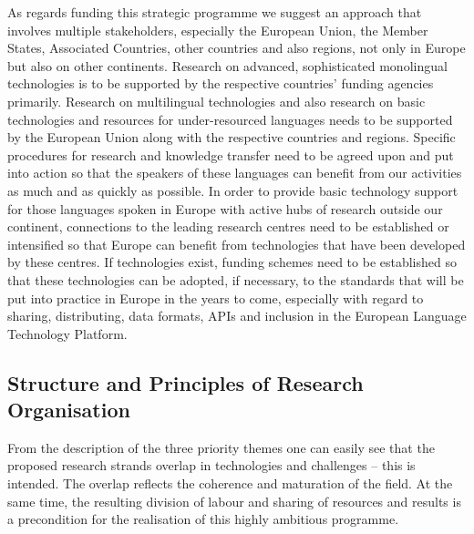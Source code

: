 \documentclass[10pt, plain]{../../metanetpaper}
\begin{document}
\begin{multicols}{2}
As regards funding this strategic programme we suggest an approach that involves multiple stakeholders, especially the European Union, the Member States, Associated Countries, other countries and also regions, not only in Europe but also on other continents. Research on advanced, sophisticated monolingual technologies is to be supported by the respective countries' funding agencies primarily. Research on multilingual technologies and also research on basic technologies and resources for under-resourced languages needs to be supported by the European Union along with the respective countries and regions. Specific procedures for research and knowledge transfer need to be agreed upon and put into action so that the speakers of these languages can benefit from our activities as much and as quickly as possible. In order to provide basic technology support for those languages spoken in Europe with active hubs of research outside our continent, connections to the leading research centres need to be established or intensified so that Europe can benefit from technologies that have been developed by these centres. If technologies exist, funding schemes need to be established so that these technologies can be adopted, if necessary, to the standards that will be put into practice in Europe in the years to come, especially with regard to sharing, distributing, data formats, APIs and inclusion in the European Language Technology Platform.

\subsection{Structure and Principles of Research Organisation}
\label{sec:struct-princ-research-org}

From the description of the three priority themes one can easily see that the proposed research strands overlap in technologies and challenges -- this is intended. The overlap reflects the coherence and maturation of the field. At the same time, the resulting division of labour and sharing of resources and results is a precondition for the realisation of this highly ambitious programme.


\end{multicols}
\end{document}
